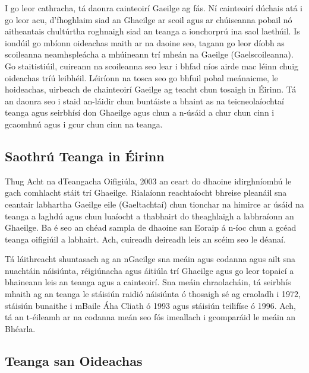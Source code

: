 \documentclass[]{../../metanetpaper}
\begin{document}
\begin{multicols}{2}

I go leor cathracha, tá daonra cainteoirí Gaeilge ag fás. Ní cainteoirí dúchais atá i go leor acu, d'fhoghlaim siad an Ghaeilge ar scoil agus ar chúiseanna pobail nó aitheantais chultúrtha roghnaigh siad an teanga a ionchorprú ina saol laethúil. Is iondúil go mbíonn oideachas maith ar na daoine seo, tagann go leor díobh as scoileanna neamhspleácha a mhúineann trí mheán na Gaeilge (Gaelscoileanna). Go staitistiúil, cuireann na scoileanna seo lear i bhfad níos airde mac léinn chuig oideachas tríú leibhéil. Léiríonn na tosca seo go bhfuil pobal meánaicme, le hoideachas, uirbeach de chainteoirí Gaeilge ag teacht chun tosaigh in Éirinn. Tá an daonra seo i staid an-láidir chun buntáiste a bhaint as na teicneolaíochtaí teanga agus seirbhísí don Ghaeilge agus chun a n-úsáid a chur chun cinn i gcaomhnú agus i gcur chun cinn na teanga.


\subsection{Saothrú Teanga in Éirinn}

Thug Acht na dTeangacha Oifigiúla, 2003 an ceart do dhaoine idirghníomhú le gach comhlacht stáit trí Ghaeilge. Rialaíonn reachtaíocht bhreise pleanáil sna ceantair labhartha Gaeilge eile (Gaeltachtaí) chun tionchar na himirce ar úsáid na teanga a laghdú agus chun luaíocht a thabhairt do theaghlaigh a labhraíonn an Ghaeilge. Ba é seo an chéad sampla de dhaoine san Eoraip á n-íoc chun a gcéad teanga oifigiúil a labhairt. Ach, cuireadh deireadh leis an scéim seo le déanaí. 


Tá láithreacht shuntasach ag an nGaeilge sna meáin agus codanna agus ailt sna nuachtáin náisiúnta, réigiúnacha agus áitiúla trí Ghaeilge agus go leor topaicí a bhaineann leis an teanga agus a cainteoirí. Sna meáin chraolacháin, tá seirbhís mhaith ag an teanga le stáisiún raidió náisiúnta ó thosaigh sé ag craoladh i 1972, stáisiún bunaithe i mBaile Áha Cliath ó 1993 agus stáisiún teilifíse ó 1996. Ach, tá an t-éileamh ar na codanna meán seo fós imeallach i gcomparáid le meáin an Bhéarla.

\subsection{Teanga san Oideachas}


\end{multicols}
\end{document}
